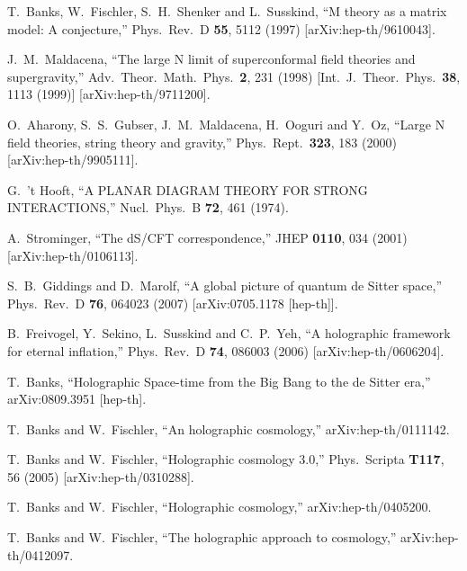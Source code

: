 \documentclass[12pt,epsf]{article}
\renewcommand{\(}{\left(}
\renewcommand{\)}{\right)}
\begin{document}
\begin{thebibliography}{999}

  T.~Banks, W.~Fischler, S.~H.~Shenker and L.~Susskind,
  ``M theory as a matrix model: A conjecture,''
  Phys.\ Rev.\  D {\bf 55}, 5112 (1997)
  [arXiv:hep-th/9610043].


  J.~M.~Maldacena,
  ``The large N limit of superconformal field theories and supergravity,''
  Adv.\ Theor.\ Math.\ Phys.\  {\bf 2}, 231 (1998)
  [Int.\ J.\ Theor.\ Phys.\  {\bf 38}, 1113 (1999)]
  [arXiv:hep-th/9711200].

  O.~Aharony, S.~S.~Gubser, J.~M.~Maldacena, H.~Ooguri and Y.~Oz,
  ``Large N field theories, string theory and gravity,''
  Phys.\ Rept.\  {\bf 323}, 183 (2000)
  [arXiv:hep-th/9905111].

  G.~'t Hooft,
  ``A PLANAR DIAGRAM THEORY FOR STRONG INTERACTIONS,''
  Nucl.\ Phys.\  B {\bf 72}, 461 (1974).

  A.~Strominger,
  ``The dS/CFT correspondence,''
  JHEP {\bf 0110}, 034 (2001)
  [arXiv:hep-th/0106113].

  S.~B.~Giddings and D.~Marolf,
  ``A global picture of quantum de Sitter space,''
  Phys.\ Rev.\  D {\bf 76}, 064023 (2007)
  [arXiv:0705.1178 [hep-th]].


  B.~Freivogel, Y.~Sekino, L.~Susskind and C.~P.~Yeh,
  ``A holographic framework for eternal inflation,''
  Phys.\ Rev.\  D {\bf 74}, 086003 (2006)
  [arXiv:hep-th/0606204].

  T.~Banks,
  ``Holographic Space-time from the Big Bang to the de Sitter era,''
  arXiv:0809.3951 [hep-th].

  T.~Banks and W.~Fischler,
  ``An holographic cosmology,''
  arXiv:hep-th/0111142.

  T.~Banks and W.~Fischler,
  ``Holographic cosmology 3.0,''
  Phys.\ Scripta {\bf T117}, 56 (2005)
  [arXiv:hep-th/0310288].

  T.~Banks and W.~Fischler,
  ``Holographic cosmology,''
  arXiv:hep-th/0405200.

  T.~Banks and W.~Fischler,
  ``The holographic approach to cosmology,''
  arXiv:hep-th/0412097.


\end{thebibliography}
\end{document}
